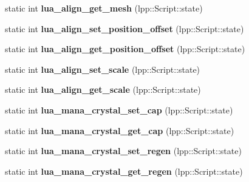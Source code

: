 \begin{DoxyCompactItemize}
\item 
static int {\bfseries lua\+\_\+align\+\_\+get\+\_\+mesh} (lpp\+::\+Script\+::state)\hypertarget{class_lua_interface_a06bfdc9d62b997d73da3630eab52bc64}{}\label{class_lua_interface_a06bfdc9d62b997d73da3630eab52bc64}

\item 
static int {\bfseries lua\+\_\+align\+\_\+set\+\_\+position\+\_\+offset} (lpp\+::\+Script\+::state)\hypertarget{class_lua_interface_a72c56871c0cf9f3b1213e1c2c547f4a9}{}\label{class_lua_interface_a72c56871c0cf9f3b1213e1c2c547f4a9}

\item 
static int {\bfseries lua\+\_\+align\+\_\+get\+\_\+position\+\_\+offset} (lpp\+::\+Script\+::state)\hypertarget{class_lua_interface_adcf691107a8f63d578f36c94cb07c084}{}\label{class_lua_interface_adcf691107a8f63d578f36c94cb07c084}

\item 
static int {\bfseries lua\+\_\+align\+\_\+set\+\_\+scale} (lpp\+::\+Script\+::state)\hypertarget{class_lua_interface_a990118118b4e6d155cadbb1155ad2286}{}\label{class_lua_interface_a990118118b4e6d155cadbb1155ad2286}

\item 
static int {\bfseries lua\+\_\+align\+\_\+get\+\_\+scale} (lpp\+::\+Script\+::state)\hypertarget{class_lua_interface_a9448935b5e3295afc7b4d47f5d6fa7f5}{}\label{class_lua_interface_a9448935b5e3295afc7b4d47f5d6fa7f5}

\item 
static int {\bfseries lua\+\_\+mana\+\_\+crystal\+\_\+set\+\_\+cap} (lpp\+::\+Script\+::state)\hypertarget{class_lua_interface_a0a4064f262ecd42c1eb382267daae55a}{}\label{class_lua_interface_a0a4064f262ecd42c1eb382267daae55a}

\item 
static int {\bfseries lua\+\_\+mana\+\_\+crystal\+\_\+get\+\_\+cap} (lpp\+::\+Script\+::state)\hypertarget{class_lua_interface_a364cd99d2b1fb5fc2914be510413961b}{}\label{class_lua_interface_a364cd99d2b1fb5fc2914be510413961b}

\item 
static int {\bfseries lua\+\_\+mana\+\_\+crystal\+\_\+set\+\_\+regen} (lpp\+::\+Script\+::state)\hypertarget{class_lua_interface_a797176694d5ebaaf6f6689237f5b4cb7}{}\label{class_lua_interface_a797176694d5ebaaf6f6689237f5b4cb7}

\item 
static int {\bfseries lua\+\_\+mana\+\_\+crystal\+\_\+get\+\_\+regen} (lpp\+::\+Script\+::state)\hypertarget{class_lua_interface_a8473d3fec136fcd06833dade3913d70f}{}\label{class_lua_interface_a8473d3fec136fcd06833dade3913d70f}


\end{DoxyCompactItemize}
